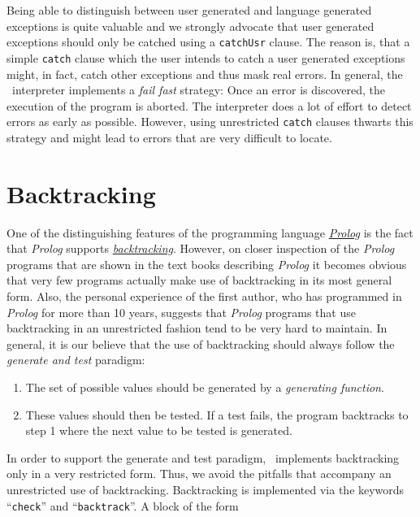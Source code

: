 Being able to distinguish between user generated  and language generated exceptions is
quite valuable and we strongly advocate that user generated exceptions should only be
catched using a \texttt{catchUsr} clause.  The reason is, that a simple
\texttt{catch} clause which the user intends to catch a user generated exceptions might,
in fact, catch 
other exceptions and thus mask real errors.  In general, the \setlx\ interpreter
implements a \emph{fail fast} strategy:  Once an error is discovered, the execution of the
program is aborted.  The interpreter does a lot of effort to detect errors as early as
possible.  However, using unrestricted \texttt{catch} clauses thwarts this strategy and
might lead to errors that are very difficult to locate.

\section{Backtracking}
One of the distinguishing features of the programming language 
\href{http://en.wikipedia.org/wiki/Prolog}{\textsl{Prolog}}
is the fact that \textsl{Prolog} supports 
\href{http://en.wikipedia.org/wiki/Backtracking}{\emph{backtracking}}.  
However, on closer inspection of the
\textsl{Prolog} programs that are shown in the text books describing \textsl{Prolog}
\cite{sterling86, bratko:90} it becomes obvious that very few programs actually make use of
backtracking in its most general form.  Also, the personal experience of the first author, who
has programmed in \textsl{Prolog} for more than 10 years, suggests that \textsl{Prolog}
programs that use backtracking in an unrestricted fashion tend to be very hard to maintain.  
In general, it is our believe that the use of backtracking should always follow the
\emph{generate and test} paradigm:
\begin{enumerate}
\item The set of possible values should be generated by a \emph{generating function}.  
\item These values should then be tested.  If a test fails, the program backtracks
      to step 1 where the next value to be tested is generated.
\end{enumerate}
In order to support the generate and test paradigm,  \setlx\ 
implements backtracking only in a very restricted form.  Thus, we avoid the
pitfalls that accompany an unrestricted use of backtracking.
Backtracking is implemented  via the keywords ``\texttt{check}'' and
``\texttt{backtrack}''.  A block of the form
\\[0.2cm]
